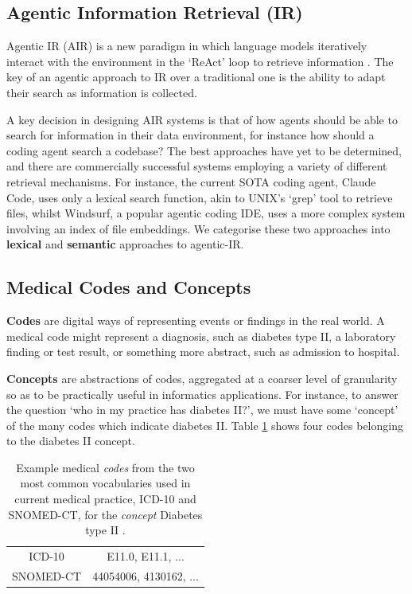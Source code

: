 \documentclass[11pt]{article}
\begin{document}
\subsection{Agentic Information Retrieval (IR)}
Agentic IR (AIR) is a new paradigm in which language models iteratively interact with the environment in the `ReAct' loop to retrieve information \citet{zhang_agentic_2025}.
The key of an agentic approach to IR over a traditional one is the ability to adapt their search as information is collected.

A key decision in designing AIR systems is that of how agents should be able to search for information in their data environment, for instance how should a coding agent search a codebase? The best approaches have yet to be determined, and there are commercially successful systems employing a variety of different retrieval mechanisms.
For instance, the current SOTA coding agent, Claude Code, uses only a lexical search function, akin to UNIX's `grep' tool to retrieve files, whilst Windsurf, a popular agentic coding IDE, uses a more complex system involving an index of file embeddings. We categorise these two approaches into \textbf{lexical} and \textbf{semantic} approaches to agentic-IR.

\subsection{Medical Codes and Concepts}

\textbf{Codes} are digital ways of representing events or findings in the real world. A medical code might represent a diagnosis, such as diabetes type II, a laboratory finding or test result, or something more abstract, such as admission to hospital.

\textbf{Concepts} are abstractions of codes, aggregated at a coarser level of granularity so as to be practically useful in informatics applications.
For instance, to answer the question `who in my practice has diabetes II?', we must have some `concept' of the many codes which indicate diabetes II. Table \ref{tab:concept-as-multi-vocab-codelist} shows four codes belonging to the diabetes II concept.


\begin{table}[h]
    \centering
    \begin{tabular}{|c|c|}
         \hline
         ICD-10 & E11.0, E11.1, ... \\
         SNOMED-CT & 44054006, 4130162, ...\\
         \hline
    \end{tabular}
    \caption{Example medical \textit{codes} from the two most common vocabularies used in current medical practice, ICD-10 and SNOMED-CT, for the \textit{concept} Diabetes type II \cite{world_health_organization_icd-10_2004, bhattacharyya_introduction_2015}.}
    \label{tab:concept-as-multi-vocab-codelist}
\end{table}
\end{document}

